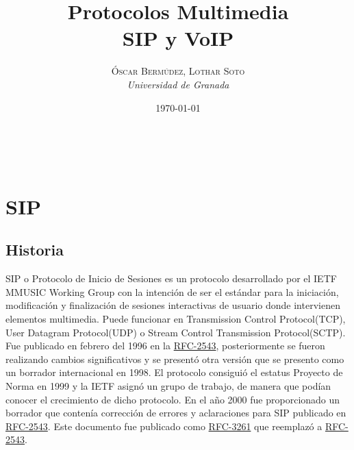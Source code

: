 \documentclass[a4paper, 11pt]{article} %
\title{\textbf{Protocolos Multimedia}\\ %
\vspace{20 pt}
SIP y VoIP} %
\author{\textsc{Óscar Bermúdez, Lothar Soto} %
\\{\textit{Universidad de Granada}}} %
\date{\today} %
\makeatletter
\newcommand{\RFC}[1]{\href{https://www.ietf.org/rfc/rfc#1.txt}{RFC-#1}}
\renewcommand{\maketitle}{ %
\begin{center} %
{\Huge\@title} %
\end{center}

\vspace{20pt} %

\begin{flushright} %
{\large\@author} %
\\\@date %

\vspace{40pt} %
\end{flushright}
}
\makeatother
\begin{document}
\maketitle %

{\parskip=2pt
\tableofcontents
}
\pagebreak

\section{SIP}
	\subsection{Historia}
	SIP o Protocolo de Inicio de Sesiones es un protocolo desarrollado por el IETF MMUSIC Working Group con la intención de ser el estándar para la iniciación, modificación y finalización de sesiones interactivas de usuario donde intervienen elementos multimedia. Puede funcionar en Transmission Control Protocol(TCP), User Datagram Protocol(UDP) o Stream Control Transmission Protocol(SCTP). Fue publicado en febrero del 1996 en la \RFC{2543}, posteriormente se fueron realizando cambios significativos y se presentó otra versión que se presento como un borrador internacional en 1998. El protocolo consiguió el estatus Proyecto de Norma en 1999 y la IETF asignó un grupo de trabajo, de manera que podían conocer el crecimiento de dicho protocolo. En el año 2000 fue proporcionado un borrador que contenía corrección de errores y aclaraciones para SIP publicado en \RFC{2543}. Este documento fue publicado como \RFC{3261} que reemplazó a \RFC{2543}.\\
	
\end{document}
